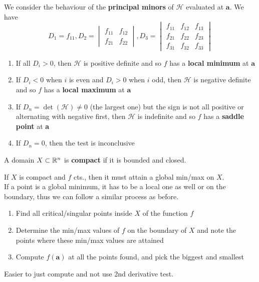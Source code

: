 \documentclass{article}
\begin{document}
\begin{cthm}
  We consider the behaviour of the \textbf{principal minors} of $\mathscr{H}$ evaluated at $\textbf{a}$.
  We have \[
    D_1 = f_{11}, D_{2} =
    \begin{vmatrix}
      f_{11} & f_{12}\\
      f_{21} & f_{22}
    \end{vmatrix}, D_3 =
    \begin{vmatrix}
      f_{11} & f_{12} & f_{13}\\
      f_{21} & f_{22} & f_{23}\\
      f_{31} & f_{32} & f_{33}
    \end{vmatrix}
  \]

  \begin{enumerate}
    \item If all $D_i > 0$, then $\mathscr{H}$ is positive definite and so $f$ has a \textbf{local minimum} at $\textbf{a}$
    \item If $D_i < 0$ when $i$ is even and $D_i > 0$ when $i$ odd, then $\mathscr{H}$ is negative definite and so $f$ has a \textbf{local maximum} at $\textbf{a}$
    \item If $D_n = \det(\mathscr{H}) \neq 0$ (the largest one) but the sign is not all positive or alternating with negative first, then $\mathscr{H}$ is indefinite and so $f$ has a \textbf{saddle point} at \textbf{a}
    \item If $D_n = 0$, then the test is inconclusive
  \end{enumerate}
\end{cthm}
\begin{definition}
  A domain $X \subset \mathbb{R}^n$ is \textbf{compact} if it is bounded and closed.
\end{definition}
\begin{cthm}
  If $X$ is compact and $f$ cts., then it must attain a global min/max on $X$.
  \\
  If a point is a global minimum, it has to be a local one as well or on the boundary, thus we can follow a similar process as before.

  \begin{enumerate}
    \item Find all critical/singular points inside $X$ of the function $f$
    \item Determine the min/max values of $f$ on the boundary of $X$ and note the points where these min/max values are attained
    \item Compute $f(\textbf{a})$ at all the points found, and pick the biggest and smallest
  \end{enumerate}

  Easier to just compute and not use 2nd derivative test.
\end{cthm}
\end{document}
